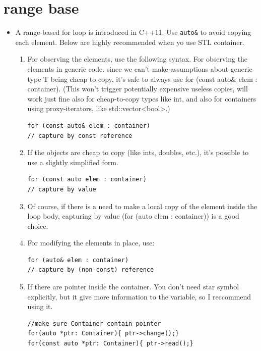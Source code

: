 \documentclass[a4paper,11pt,twoside]{book}
\begin{document}
\section{range base}
\begin{itemize}
	
	\item A range-based for loop is introduced in C++11. Use \texttt{auto\&} to avoid copying each element. Below are highly recommended when yo use STL container.
	
	\begin{enumerate}
		\item For observing the elements, use the following syntax. For observing the elements in generic code. since we can't make assumptions about generic type T being cheap to copy, it's safe to always use for (const auto\& elem : container).
		(This won't trigger potentially expensive useless copies, will work just fine also for cheap-to-copy types like int, and also for containers using proxy-iterators, like std::vector<bool>.)
\begin{lstlisting}[numbers=none]
for (const auto& elem : container)    
// capture by const reference
\end{lstlisting}	
		
		
		\item If the objects are cheap to copy (like ints, doubles, etc.), it's possible to use a slightly simplified form. 
		
\begin{lstlisting}[numbers=none]
for (const auto elem : container)   
// capture by value
\end{lstlisting}            
		
		\item Of course, if there is a need to make a local copy of the element inside the loop body, capturing by value (for (auto elem : container)) is a good choice.
		
		\item For modifying the elements in place, use:
\begin{lstlisting}[numbers=none]
for (auto& elem : container)    
// capture by (non-const) reference
\end{lstlisting}
		
		
		
		\item If there are pointer inside the container. You don't need star symbol explicitly, but it give more information to the variable, so I reccommend using it.
\begin{lstlisting}[numbers=none]
//make sure Container contain pointer
for(auto *ptr: Container){ ptr->change();}
for(const auto *ptr: Container){ ptr->read();}
\end{lstlisting}
		

\end{enumerate}
\end{itemize}
\end{document}

